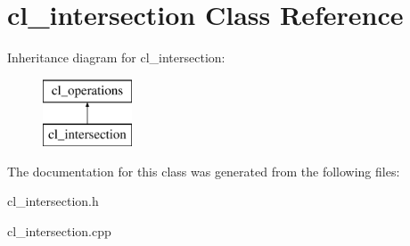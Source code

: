 \hypertarget{classcl__intersection}{}\section{cl\+\_\+intersection Class Reference}
\label{classcl__intersection}
Inheritance diagram for cl\+\_\+intersection\+:\begin{figure}[H]
\begin{center}
\leavevmode
\includegraphics[height=2.000000cm]{classcl__intersection}
\end{center}
\end{figure}


The documentation for this class was generated from the following files\+:\begin{DoxyCompactItemize}
\item 
cl\+\_\+intersection.\+h\item 
cl\+\_\+intersection.\+cpp\end{DoxyCompactItemize}
